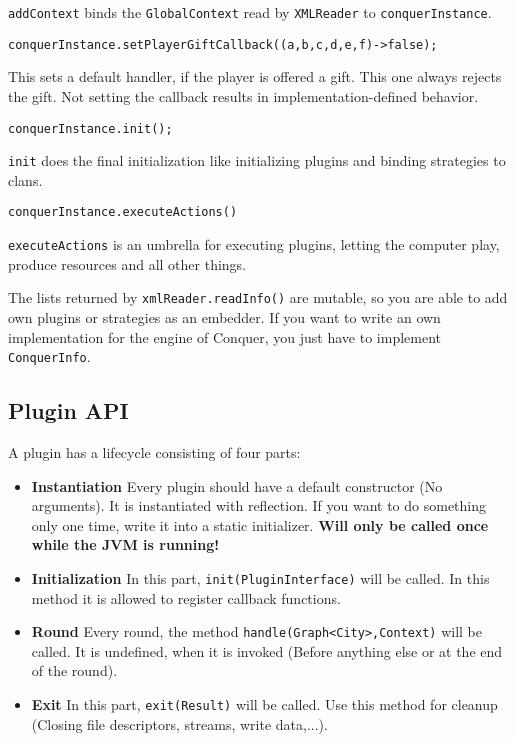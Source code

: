 \documentclass{article}
\begin{document}
\texttt{addContext} binds the \texttt{GlobalContext} read by \texttt{XMLReader} to \texttt{conquerInstance}.
\begin{verbatim}
conquerInstance.setPlayerGiftCallback((a,b,c,d,e,f)->false);
\end{verbatim}
This sets a default handler, if the player is offered a gift. This one always rejects the gift. Not setting the callback results in implementation-defined behavior.
\begin{verbatim}
conquerInstance.init();
\end{verbatim}
\texttt{init} does the final initialization like initializing plugins and binding strategies to clans.
\begin{verbatim}
conquerInstance.executeActions()
\end{verbatim}
\texttt{executeActions} is an umbrella for executing plugins, letting the computer play, produce resources and all other things.\newline

The lists returned by \texttt{xmlReader.readInfo()} are mutable, so you are able to add own plugins or strategies as an embedder.\newline
If you want to write an own implementation for the engine of Conquer, you just have to implement \texttt{ConquerInfo}.

\subsection{Plugin API}
A plugin has a lifecycle consisting of four parts:
\begin{itemize}
	\item \textbf{Instantiation} Every plugin should have a default constructor (No arguments). It is instantiated with reflection. If you want to do something only one time, write it into a static initializer. \textbf{Will only be called once while the JVM is running!}
	\item \textbf{Initialization} In this part, \texttt{init(PluginInterface)} will be called. In this method it is allowed to register callback functions. 
	\item \textbf{Round} Every round, the method \texttt{handle(Graph<City>,Context)} will be called. It is undefined, when it is invoked (Before anything else or at the end of the round).
	\item \textbf{Exit} In this part, \texttt{exit(Result)} will be called. Use this method for cleanup (Closing file descriptors, streams, write data,...).
	
\end{itemize}
\end{document}
